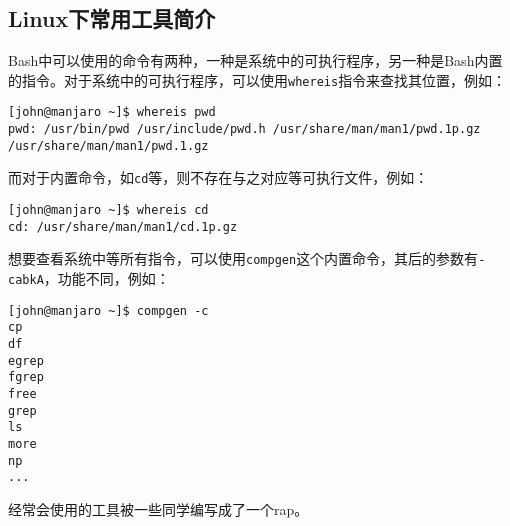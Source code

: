 \subsection{Linux下常用工具简介}
Bash中可以使用的命令有两种，一种是系统中的可执行程序，另一种是Bash内置的指令。对于系统中的可执行程序，可以使用\texttt{whereis}指令来查找其位置，例如：
\begin{lstlisting}[frame=none]
[john@manjaro ~]$ whereis pwd
pwd: /usr/bin/pwd /usr/include/pwd.h /usr/share/man/man1/pwd.1p.gz /usr/share/man/man1/pwd.1.gz
\end{lstlisting}
而对于内置命令，如\texttt{cd}等，则不存在与之对应等可执行文件，例如：
\begin{lstlisting}[frame=none]
[john@manjaro ~]$ whereis cd
cd: /usr/share/man/man1/cd.1p.gz
\end{lstlisting}
想要查看系统中等所有指令，可以使用\texttt{compgen}这个内置命令，其后的参数有\texttt{-cabkA}，功能不同，例如：
\begin{lstlisting}[frame=none]
[john@manjaro ~]$ compgen -c
cp
df
egrep
fgrep
free
grep
ls
more
np
...
\end{lstlisting}
经常会使用的工具被一些同学编写成了一个rap。
